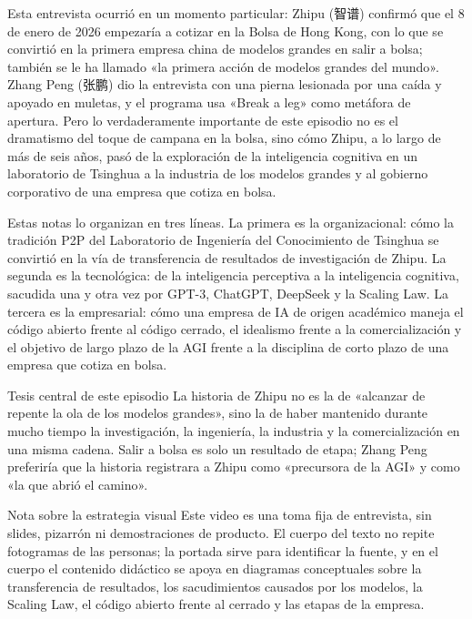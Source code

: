 \documentclass[a4paper]{article}
\begin{document}
Esta entrevista ocurrió en un momento particular: Zhipu (智谱) confirmó que el 8 de enero de 2026 empezaría a cotizar en la Bolsa de Hong Kong, con lo que se convirtió en la primera empresa china de modelos grandes en salir a bolsa; también se le ha llamado «la primera acción de modelos grandes del mundo». Zhang Peng (张鹏) dio la entrevista con una pierna lesionada por una caída y apoyado en muletas, y el programa usa «Break a leg» como metáfora de apertura. Pero lo verdaderamente importante de este episodio no es el dramatismo del toque de campana en la bolsa, sino cómo Zhipu, a lo largo de más de seis años, pasó de la exploración de la inteligencia cognitiva en un laboratorio de Tsinghua a la industria de los modelos grandes y al gobierno corporativo de una empresa que cotiza en bolsa.

Estas notas lo organizan en tres líneas. La primera es la organizacional: cómo la tradición P2P del Laboratorio de Ingeniería del Conocimiento de Tsinghua se convirtió en la vía de transferencia de resultados de investigación de Zhipu. La segunda es la tecnológica: de la inteligencia perceptiva a la inteligencia cognitiva, sacudida una y otra vez por GPT-3, ChatGPT, DeepSeek y la Scaling Law. La tercera es la empresarial: cómo una empresa de IA de origen académico maneja el código abierto frente al código cerrado, el idealismo frente a la comercialización y el objetivo de largo plazo de la AGI frente a la disciplina de corto plazo de una empresa que cotiza en bolsa.

\begin{importantbox}{Tesis central de este episodio}
La historia de Zhipu no es la de «alcanzar de repente la ola de los modelos grandes», sino la de haber mantenido durante mucho tiempo la investigación, la ingeniería, la industria y la comercialización en una misma cadena. Salir a bolsa es solo un resultado de etapa; Zhang Peng preferiría que la historia registrara a Zhipu como «precursora de la AGI» y como «la que abrió el camino».
\end{importantbox}

\begin{knowledgebox}{Nota sobre la estrategia visual}
Este video es una toma fija de entrevista, sin slides, pizarrón ni demostraciones de producto. El cuerpo del texto no repite fotogramas de las personas; la portada sirve para identificar la fuente, y en el cuerpo el contenido didáctico se apoya en diagramas conceptuales sobre la transferencia de resultados, los sacudimientos causados por los modelos, la Scaling Law, el código abierto frente al cerrado y las etapas de la empresa.
\end{knowledgebox}
\end{document}
